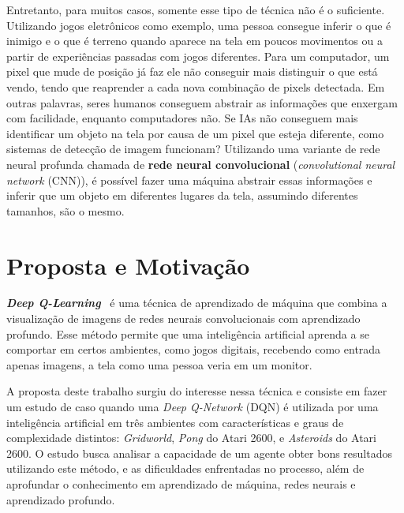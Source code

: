 Entretanto, para muitos casos, somente esse tipo de técnica não é o suficiente.
Utilizando jogos eletrônicos como exemplo, uma pessoa consegue inferir o que é inimigo e o que é terreno quando aparece na tela em poucos movimentos ou a partir de experiências passadas com jogos diferentes.
Para um computador, um pixel que mude de posição já faz ele não conseguir mais distinguir o que está vendo, tendo que reaprender a cada nova combinação de pixels detectada.
Em outras palavras, seres humanos conseguem abstrair as informações que enxergam com facilidade, enquanto computadores não.
Se IAs não conseguem mais identificar um objeto na tela por causa de um pixel que esteja diferente, como sistemas de detecção de imagem funcionam?
Utilizando uma variante de rede neural profunda chamada de \textbf{rede neural convolucional} (\textit{convolutional neural network} (CNN)), é possível fazer uma máquina abstrair essas informações e inferir que um objeto em diferentes lugares da tela, assumindo diferentes tamanhos, são o mesmo.

\section{Proposta e Motivação}
\label{sec:motivacao_proposta}

\textbf{\textit{Deep Q-Learning}}~\cite{DBLP:journals/corr/MnihKSGAWR13} é uma técnica de aprendizado de máquina que combina a visualização de imagens de redes neurais convolucionais com aprendizado profundo.
Esse método permite que uma inteligência artificial aprenda a se comportar em certos ambientes, como jogos digitais, recebendo como entrada apenas imagens, a tela como uma pessoa veria em um monitor.

A proposta deste trabalho surgiu do interesse nessa técnica e consiste em fazer um estudo de caso quando uma \textit{Deep Q-Network} (DQN) é utilizada por uma inteligência artificial em três ambientes com características e graus de complexidade distintos: \textit{Gridworld}, \textit{Pong} do Atari 2600, e \textit{Asteroids} do Atari 2600.
O estudo busca analisar a capacidade de um agente obter bons resultados utilizando este método, e as dificuldades enfrentadas no processo, além de aprofundar o conhecimento em aprendizado de máquina, redes neurais e aprendizado profundo.

